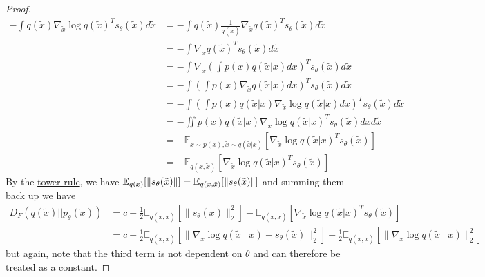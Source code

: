 \documentclass{article}
\begin{document}
\begin{proof}
      \begin{align}
        -\int q(\tilde{x})\nabla_{\tilde{x}} \log q(\tilde{x})^T s_\theta(\tilde{x}) d\tilde{x} & = -\int q(\tilde{x})\frac{1}{q(\tilde{x})}\nabla_{\tilde{x}}q(\tilde{x})^T s_\theta(\tilde{x}) d\tilde{x} \\
                                                                                                & = -\int \nabla_{\tilde{x}}q(\tilde{x})^T s_\theta(\tilde{x}) d\tilde{x} \\
        & = -\int \nabla_{\tilde{x}}\left(\int p(x)q(\tilde{x}|x) dx\right)^T s_\theta(\tilde{x}) d\tilde{x} \\
        & = -\int \left(\int p(x)\nabla_{\tilde{x}}q(\tilde{x}|x) dx\right)^T s_\theta(\tilde{x}) d\tilde{x} \\
        & = -\int \left(\int p(x)q(\tilde{x}|x)\nabla_{\tilde{x}} \log q(\tilde{x}|x) dx\right)^T s_\theta(\tilde{x}) d\tilde{x} \\
        & = -\iint p(x)q(\tilde{x}|x)\nabla_{\tilde{x}} \log q(\tilde{x}|x)^T s_\theta(\tilde{x}) dx d\tilde{x} \\
        & = -\mathbb{E}_{x\sim p(x),\tilde{x}\sim q(\tilde{x}|x)}\left[\nabla_{\tilde{x}} \log q(\tilde{x}|x)^T s_\theta(\tilde{x})\right] \\
        & = -\mathbb{E}_{q(x, \tilde{x})}\left[\nabla_{\tilde{x}} \log q(\tilde{x}|x)^T s_\theta(\tilde{x})\right] 
      \end{align} 
      By the \hyperref[prob-thm:tower-rule-2]{tower rule}, we have $\mathbb{E}_{q(x)} [ \|s_\theta (\Tilde{x})\|] = \mathbb{E}_{q(x, \tilde{x})} [ \|s_\theta (\Tilde{x})\|]$ and summing them back up we have 
      \begin{align}
        D_F (q(\tilde{x}) || p_\theta (\tilde{x})) & = c + \frac{1}{2} \mathbb{E}_{q(x, \tilde{x})} [\|s_\theta (\tilde{x})\|_2^2] - \mathbb{E}_{q(x, \tilde{x})}\left[\nabla_{\tilde{x}} \log q(\tilde{x}|x)^T s_\theta(\tilde{x})\right] \\
                                                   & = c + \frac{1}{2} \mathbb{E}_{q(x, \tilde{x})} [ \| \nabla_{\tilde{x}} \log q(\tilde{x} \mid x) - s_\theta (\tilde{x})\|_2^2 ] - \frac{1}{2} \mathbb{E}_{q(x, \tilde{x})} [ \| \nabla_{\tilde{x}} \log q(\tilde{x} \mid x) \|_2^2 ]
      \end{align}
      but again, note that the third term is not dependent on $\theta$ and can therefore be treated as a constant. 
    \end{proof}
\end{document}
